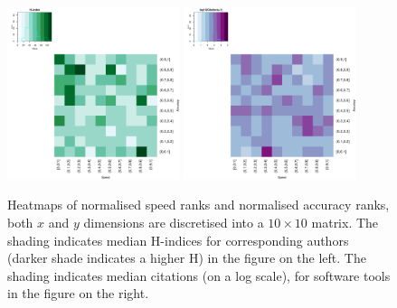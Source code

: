 \documentclass[fleqn,10pt]{SelfArx} %
\begin{document}




\begin{figure}[H]
\centering
\includegraphics[width=0.45\textwidth]{hindex-SpeedVsAccuracy-heatmap.pdf}
\includegraphics[width=0.45\textwidth]{cites-SpeedVsAccuracy-heatmap.pdf}
\caption{Heatmaps of normalised speed ranks and normalised accuracy
  ranks, both $x$ and $y$ dimensions are discretised into a $10 \times
  10$ matrix. The shading indicates median H-indices for corresponding
  authors (darker shade indicates a higher H) in the figure on the
  left. The shading indicates median citations (on a log scale), for
  software tools in the figure on the right. }
\label{fig:heatmaps}
\end{figure}
\end{document}
